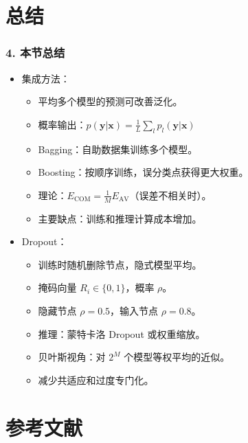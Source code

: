 \documentclass[t,aspectratio=169]{beamer} %
\begin{document}
\section{总结}

\begin{frame}
    \frametitle{4. 本节总结}
    \begin{itemize}
        \item \alert{集成方法}：
        \begin{itemize}
            \item 平均多个模型的预测可改善泛化。
            \item 概率输出：$p(\mathbf{y}|\mathbf{x}) = \frac{1}{L} \sum_l p_l(\mathbf{y}|\mathbf{x})$
            \item \alert{Bagging}：自助数据集训练多个模型。
            \item \alert{Boosting}：按顺序训练，误分类点获得更大权重。
            \item 理论：$E_{\text{COM}} = \frac{1}{M} E_{\text{AV}}$（误差不相关时）。
            \item 主要缺点：训练和推理计算成本增加。
        \end{itemize}
        \item \alert{Dropout}：
        \begin{itemize}
            \item 训练时随机删除节点，隐式模型平均。
            \item 掩码向量 $R_i \in \{0, 1\}$，概率 $\rho$。
            \item 隐藏节点 $\rho = 0.5$，输入节点 $\rho = 0.8$。
            \item 推理：蒙特卡洛 Dropout 或权重缩放。
            \item 贝叶斯视角：对 $2^M$ 个模型等权平均的近似。
            \item 减少共适应和过度专门化。
        \end{itemize}
    \end{itemize}
\end{frame}

\section{参考文献}
\end{document}
